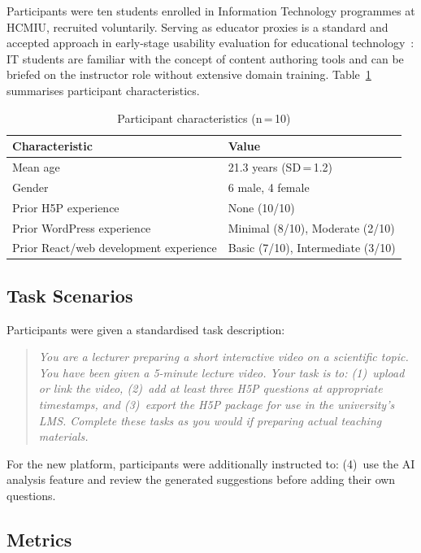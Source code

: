 Participants were ten students enrolled in Information Technology programmes
at HCMIU, recruited voluntarily. Serving as educator proxies is a standard
and accepted approach in early-stage usability evaluation for educational
technology~\cite{nielsen1994}: IT students are familiar with the concept of
content authoring tools and can be briefed on the instructor role without
extensive domain training. Table~\ref{tab:participants} summarises
participant characteristics.

\begin{table}[H]
  \centering
  \caption{Participant characteristics (n\,=\,10)}
  \label{tab:participants}
  \begin{tabularx}{\linewidth}{Xl}
    \toprule
    \textbf{Characteristic} & \textbf{Value} \\
    \midrule
    Mean age & 21.3 years (SD\,=\,1.2) \\
    Gender & 6 male, 4 female \\
    Prior H5P experience & None (10/10) \\
    Prior WordPress experience & Minimal (8/10), Moderate (2/10) \\
    Prior React/web development experience & Basic (7/10), Intermediate (3/10) \\
    \bottomrule
  \end{tabularx}
\end{table}

\subsection{Task Scenarios}

Participants were given a standardised task description:

\begin{quote}
  \itshape You are a lecturer preparing a short interactive video on a
  scientific topic. You have been given a 5-minute lecture video. Your task
  is to: (1)~upload or link the video, (2)~add at least three H5P questions
  at appropriate timestamps, and (3)~export the H5P package for use in the
  university's LMS. Complete these tasks as you would if preparing actual
  teaching materials.
\end{quote}

For the new platform, participants were additionally instructed to:
(4)~use the AI analysis feature and review the generated suggestions before
adding their own questions.

\subsection{Metrics}

